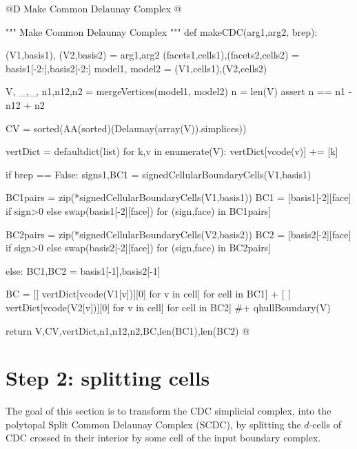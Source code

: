 \documentclass[11pt,oneside]{article}	%
\begin{document}
	
@D Make Common Delaunay Complex
@{""" Make Common Delaunay Complex """
def makeCDC(arg1,arg2, brep):

	(V1,basis1), (V2,basis2) = arg1,arg2
	(facets1,cells1),(facets2,cells2) = basis1[-2:],basis2[-2:]
	model1, model2 = (V1,cells1),(V2,cells2)

	V, _,_, n1,n12,n2 = mergeVertices(model1, model2)
	n = len(V)
	assert n == n1 - n12 + n2
	
	CV = sorted(AA(sorted)(Delaunay(array(V)).simplices))
	
	vertDict = defaultdict(list)
	for k,v in enumerate(V): vertDict[vcode(v)] += [k]
	
	if brep == False:
    	signs1,BC1 = signedCellularBoundaryCells(V1,basis1)
    	
    	BC1pairs = zip(*signedCellularBoundaryCells(V1,basis1))
    	BC1 = [basis1[-2][face] if sign>0 else swap(basis1[-2][face]) for (sign,face) in BC1pairs]
    
    	BC2pairs = zip(*signedCellularBoundaryCells(V2,basis2))
    	BC2 = [basis2[-2][face] if sign>0 else swap(basis2[-2][face]) for (sign,face) in BC2pairs] 

	else:
		BC1,BC2 = basis1[-1],basis2[-1]
    
	BC = [[ vertDict[vcode(V1[v])][0] for v in cell] for cell in BC1] + [ 
			[ vertDict[vcode(V2[v])][0] for v in cell] for cell in BC2] #+ qhullBoundary(V)
		
	
	return V,CV,vertDict,n1,n12,n2,BC,len(BC1),len(BC2)
@}




\section{Step 2: splitting cells}

The goal of this section is to transform the CDC simplicial complex, into the polytopal Split Common Delaunay Complex (SCDC), by splitting the $d$-cells of CDC crossed in their interior by some cell of the input boundary complex.
\end{document}
